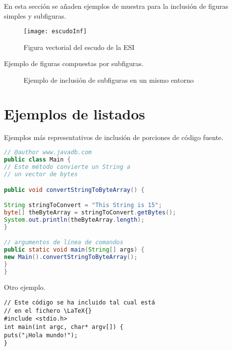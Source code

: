 En esta sección se añaden ejemplos de muestra para la inclusión de figuras simples y subfiguras.

\begin{figure}[htb]
	\centering
	\texttt{[image: escudoInf]}
	\caption[Ejemplo de figura]{Figura vectorial del escudo de la ESI}
	\label{fig:ejFigure}
\end{figure}


\noindent Ejemplo de figuras compuestas por subfiguras.

\begin{figure}[htb]
	\centering
	\caption[Ejemplo de subfiguras]{Ejemplo de inclusión de subfiguras en un mismo entorno}
	\label{fig:ejSubfigures}
\end{figure}


\clearpage


\section{Ejemplos de listados}
\label{sec:ejListados}

Ejemplos más representativos de inclusión de porciones de código fuente.

\begin{lstlisting}[language=Java,float=ht,caption={[Código fuente en Java]Ejemplo de código fuente en lenguaje Java},label=lst:java]
// @author www.javadb.com
public class Main {    
// Este método convierte un String a
// un vector de bytes

public void convertStringToByteArray() {

String stringToConvert = "This String is 15";      
byte[] theByteArray = stringToConvert.getBytes();        
System.out.println(theByteArray.length);        
}

// argumentos de línea de comandos 
public static void main(String[] args) {
new Main().convertStringToByteArray();
}
}
\end{lstlisting}



\noindent Otro ejemplo.

\begin{lstlisting}[style=C-ruled,float=ht,caption={Ejemplo de código C},label=lst:codC]
// Este código se ha incluido tal cual está 
// en el fichero \LaTeX{}
#include <stdio.h>
int main(int argc, char* argv[]) {
puts("¡Hola mundo!");
}
\end{lstlisting}


